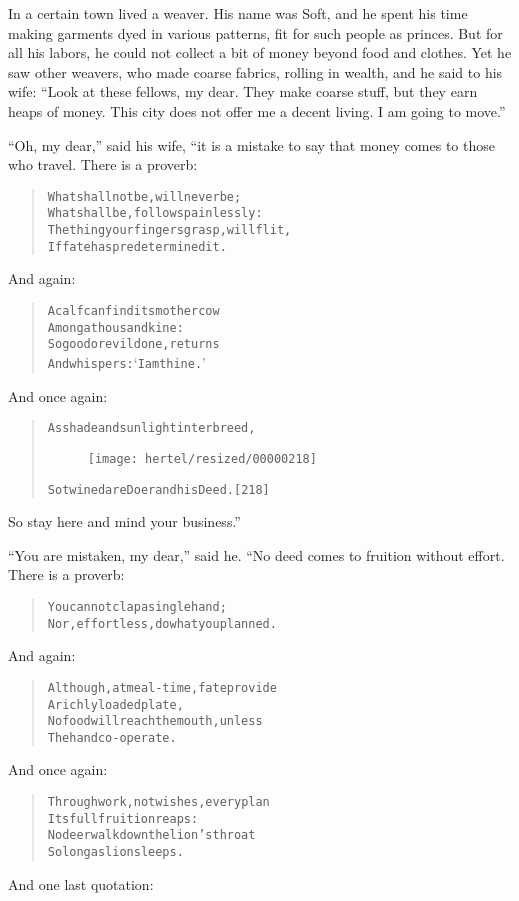 \documentclass[article, twoside, 10pt]{memoir}
\renewenvironment{verbatim}{%
\begin{quote}%
\vskip -10pt%
\begin{alltt}\normalfont\small}{\end{alltt}%
\end{quote}%
\vskip -10pt
} %
\begin{document}
In a certain town lived a weaver. His name was Soft, and he spent
his time making garments dyed in various patterns, fit for such
people as princes. But for all his labors, he could not collect a
bit of money beyond food and clothes. Yet he saw other weavers, who
made coarse fabrics, rolling in wealth, and he said to his wife:
``Look at these fellows, my dear. They make coarse stuff, but they earn heaps of money. This city does not offer me a decent living. I am going to move.''

``Oh, my dear,'' said his wife, “it is a mistake to say that money
comes to those who travel. There is a proverb:

\begin{verbatim}
What shall not be, will never be;
What shall be, follows painlessly:
The thing your fingers grasp, will flit,
If fate has predetermined it.
\end{verbatim}
And again:

\begin{verbatim}
A calf can find its mother cow
    Among a thousand kine:
So good or evil done, returns
    And whispers: ‘I am thine.’
\end{verbatim}
And once again:

\begin{verbatim}
As shade and sunlight interbreed,
\begin{figure}[p]\texttt{[image: hertel/resized/00000218]}\end{figure}So twined are Doer and his Deed.                        [218]
\end{verbatim}
So stay here and mind your business.”

``You are mistaken, my dear,'' said he. “No deed comes to fruition
without effort. There is a proverb:

\begin{verbatim}
You cannot clap a single hand;
Nor, effortless, do what you planned.
\end{verbatim}
And again:

\begin{verbatim}
Although, at meal-time, fate provide
    A richly loaded plate,
No food will reach the mouth, unless
    The hand co-operate.
\end{verbatim}
And once again:

\begin{verbatim}
Through work, not wishes, every plan
    Its full fruition reaps:
No deer walk down the lion's throat
    So long as lion sleeps.
\end{verbatim}
And one last quotation:
\end{document}
